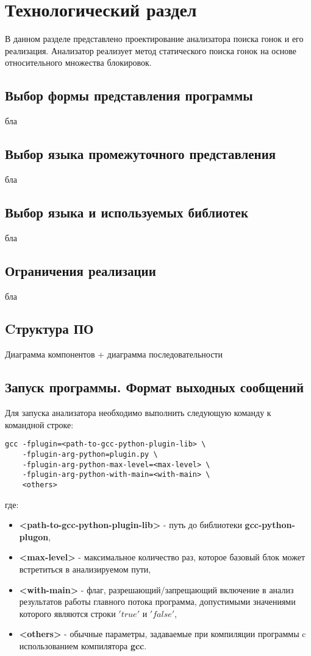 \chapter{Технологический раздел}
\label{cha:impl}

В данном разделе представлено проектирование анализатора поиска гонок и его реализация. Анализатор реализует метод статического поиска гонок на основе относительного множества блокировок.

\section{Выбор формы представления программы}
бла

\section{Выбор языка промежуточного представления}
бла

\section{Выбор языка и используемых библиотек}
бла

\section{Ограничения реализации}
бла

\section{Cтруктура ПО}
Диаграмма компонентов + диаграмма последовательности

\section{Запуск программы. Формат выходных сообщений}

Для запуска анализатора необходимо выполнить следующую команду к командной строке:
\begin{verbatim}
gcc -fplugin=<path-to-gcc-python-plugin-lib> \
    -fplugin-arg-python=plugin.py \
    -fplugin-arg-python-max-level=<max-level> \
    -fplugin-arg-python-with-main=<with-main> \
    <others>
\end{verbatim}
где:
\begin{itemize}
  \item \textbf{<path-to-gcc-python-plugin-lib>} - путь до библиотеки \textbf{gcc-python-plugon},
  \item \textbf{<max-level>} - максимальное количество раз, которое базовый блок может встретиться в анализируемом пути,
  \item \textbf{<with-main>} - флаг, разрешающий/запрещающий включение в анализ результатов работы главного потока программа, допустимыми значениями которого являются строки $'true'$ и $'false'$,
  \item \textbf{<others>} - обычные параметры, задаваемые при компиляции программы c использованием компилятора \textbf{gcc}.
\end{itemize}

